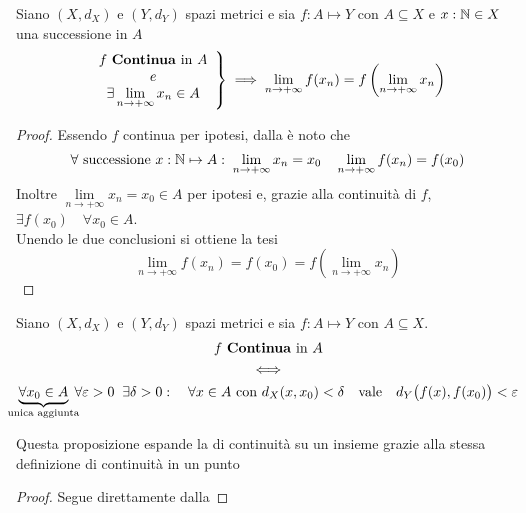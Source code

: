 \begin{corollary}
	Siano $(X,d_X)$ e $(Y,d_Y)$ spazi metrici e sia $f: A \mapsto Y$ con $A \subseteq X$ e $x: \mathbb{N} \in X$ una successione in $A$
	\begin{equation*}
		\left.
		\begin{array}{c}
			f \text{ \textbf{Continua} in } A\\
			e\\
			\exists \lim\limits_{n \to +\infty} x_n \in A
		\end{array}
		\right\} \implies
		\lim\limits_{n \to +\infty} f(x_n) = f\left( \lim\limits_{n \to +\infty} x_n \right)
	\end{equation*}
	\begin{proof}
		Essendo $f$ continua per ipotesi, dalla  è noto che
		\[\forall \text{ successione } x:\mathbb{N} \mapsto A:\; \lim\limits_{n \to +\infty} x_n = x_0 \quad \lim\limits_{n \to +\infty} f(x_n) = f(x_0)\]
		Inoltre $\lim\limits_{n \to +\infty} x_n = x_0 \in A$ per ipotesi e, grazie alla continuità di $f$, $\exists f(x_0) \quad \forall x_0 \in A$.\\
		Unendo le due conclusioni si ottiene la tesi
		\[\lim\limits_{n \to +\infty} f(x_n) = f(x_0) = f\left( \lim\limits_{n \to +\infty} x_n \right)\]
	\end{proof}
\end{corollary}

\begin{proposition}
	\label{prop:funz_cont_per_succ_in_ins}
	Siano $(X,d_X)$ e $(Y,d_Y)$ spazi metrici e sia $f: A \mapsto Y$ con $A \subseteq X$.
	\begin{equation*}
		\begin{gathered}
			f \text{ \textbf{Continua} in } A\\
			\iff\\
			\underbrace{\forall x_0 \in A}_{\mathclap{\text{unica aggiunta}}} \; \forall \varepsilon > 0\;\;\exists \delta > 0:\quad \forall x \in A \text{ con } d_X(x,x_0)<\delta \quad \text{vale} \quad d_Y \bigl(f(x),f(x_0)\bigr) < \varepsilon
		\end{gathered}
	\end{equation*}
	\begin{note}
		Questa proposizione espande la  di continuità su un insieme grazie alla stessa definizione di continuità in un punto
	\end{note}
	\begin{proof}
		Segue direttamente dalla 
	\end{proof}
\end{proposition}

